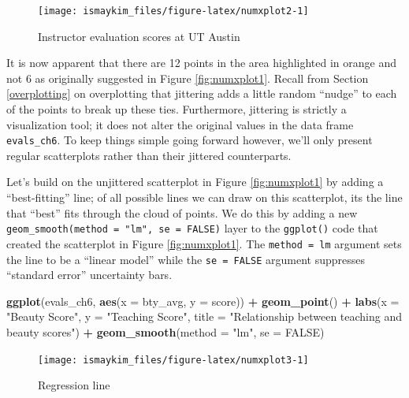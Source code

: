 \documentclass[12pt, krantz2,]{krantz}
\makeatletter
\newenvironment{Shaded}{\begin{snugshade}}{\end{snugshade}}
\newcommand{\DataTypeTok}[1]{\textcolor[rgb]{0.27,0.27,0.27}{#1}}
\newcommand{\KeywordTok}[1]{\textcolor[rgb]{0.27,0.27,0.27}{\textbf{#1}}}
\newcommand{\NormalTok}[1]{#1}
\newcommand{\OperatorTok}[1]{\textcolor[rgb]{0.43,0.43,0.43}{\textbf{#1}}}
\newcommand{\OtherTok}[1]{\textcolor[rgb]{0.37,0.37,0.37}{#1}}
\newcommand{\StringTok}[1]{\textcolor[rgb]{0.5,0.5,0.5}{#1}}
\newenvironment{kframe}{%
\medskip{}
\setlength{\fboxsep}{.8em}
 \def\at@end@of@kframe{}%
 \ifinner\ifhmode%
  \def\at@end@of@kframe{\end{minipage}}%
  \begin{minipage}{\columnwidth}%
 \fi\fi%
 \def\FrameCommand##1{\hskip\@totalleftmargin \hskip-\fboxsep
 \colorbox{shadecolor}{##1}\hskip-\fboxsep
     \hskip-\linewidth \hskip-\@totalleftmargin \hskip\columnwidth}%
 \MakeFramed {\advance\hsize-\width
   \@totalleftmargin\z@ \linewidth\hsize
   \@setminipage}}%
 {\par\unskip\endMakeFramed%
 \at@end@of@kframe}
\renewenvironment{Shaded}{\begin{kframe}}{\end{kframe}}
\makeatother
\begin{document}
\begin{figure}

{\centering \texttt{[image: ismaykim\_files/figure-latex/numxplot2-1]} 

}

\caption{Instructor evaluation scores at UT Austin}\label{fig:numxplot2}
\end{figure}

It is now apparent that there are 12 points in the area highlighted in orange and not 6 as originally suggested in Figure \ref{fig:numxplot1}. Recall from Section \ref{overplotting} on overplotting that jittering adds a little random ``nudge'' to each of the points to break up these ties. Furthermore, jittering is strictly a visualization tool; it does not alter the original values in the data frame \texttt{evals\_ch6}. To keep things simple going forward however, we'll only present regular scatterplots rather than their jittered counterparts.

Let's build on the unjittered scatterplot in Figure \ref{fig:numxplot1} by adding a ``best-fitting'' line; of all possible lines we can draw on this scatterplot, its the line that ``best'' fits through the cloud of points. We do this by adding a new \texttt{geom\_smooth(method\ =\ "lm",\ se\ =\ FALSE)} layer to the \texttt{ggplot()} code that created the scatterplot in Figure \ref{fig:numxplot1}. The \texttt{method\ =\ lm} argument sets the line to be a ``linear model'' while the \texttt{se\ =\ FALSE} argument suppresses ``standard error'' uncertainty bars.

\begin{Shaded}
\begin{Highlighting}[]
\KeywordTok{ggplot}\NormalTok{(evals_ch6, }\KeywordTok{aes}\NormalTok{(}\DataTypeTok{x =}\NormalTok{ bty_avg, }\DataTypeTok{y =}\NormalTok{ score)) }\OperatorTok{+}
\StringTok{  }\KeywordTok{geom_point}\NormalTok{() }\OperatorTok{+}
\StringTok{  }\KeywordTok{labs}\NormalTok{(}\DataTypeTok{x =} \StringTok{"Beauty Score"}\NormalTok{, }\DataTypeTok{y =} \StringTok{"Teaching Score"}\NormalTok{,}
       \DataTypeTok{title =} \StringTok{"Relationship between teaching and beauty scores"}\NormalTok{) }\OperatorTok{+}\StringTok{  }
\StringTok{  }\KeywordTok{geom_smooth}\NormalTok{(}\DataTypeTok{method =} \StringTok{"lm"}\NormalTok{, }\DataTypeTok{se =} \OtherTok{FALSE}\NormalTok{)}
\end{Highlighting}
\end{Shaded}

\begin{figure}

{\centering \texttt{[image: ismaykim\_files/figure-latex/numxplot3-1]} 

}

\caption{Regression line}\label{fig:numxplot3}
\end{figure}
\end{document}
